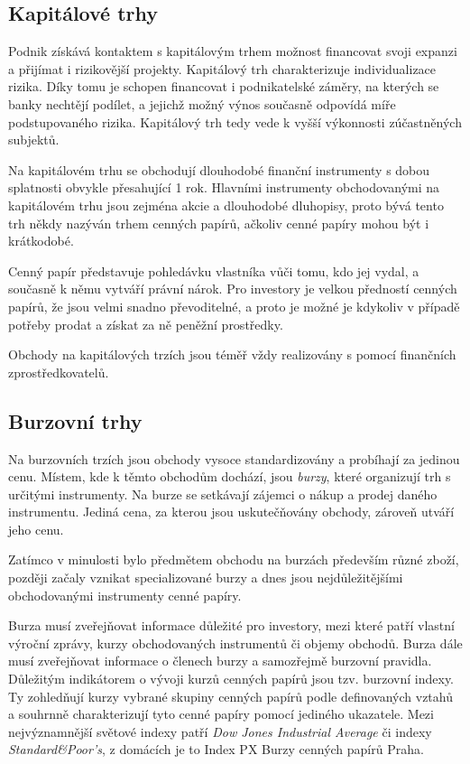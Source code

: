 \documentclass[thesis=M,czech]{FITthesis}[2012/06/26]
\begin{document}
\subsection{Kapitálové trhy}

Podnik získává kontaktem s kapitálovým trhem možnost financovat svoji expanzi a přijímat i rizikovější projekty. Kapitálový 
trh charakterizuje individualizace rizika. Díky tomu je schopen financovat i podnikatelské záměry, na kterých se banky 
nechtějí podílet, a jejichž možný výnos současně odpovídá míře podstupovaného rizika. Kapitálový trh tedy vede k vyšší 
výkonnosti zúčastněných subjektů. %

Na kapitálovém trhu se obchodují dlouhodobé finanční instrumenty s dobou splatnosti obvykle přesahující 1 rok. Hlavními 
instrumenty obchodovanými na kapitálovém trhu jsou zejména akcie a dlouhodobé dluhopisy, proto bývá tento trh někdy 
nazýván trhem cenných papírů, ačkoliv cenné papíry mohou být i krátkodobé. %

Cenný papír představuje pohledávku vlastníka 
vůči tomu, kdo jej vydal, a současně k němu vytváří právní nárok. Pro investory je velkou předností cenných papírů, 
že jsou velmi snadno převoditelné, a proto je možné je kdykoliv v případě potřeby prodat a získat za ně peněžní prostředky. 

Obchody na kapitálových trzích jsou téměř vždy realizovány s pomocí finančních zprostředkovatelů. %


\subsection{Burzovní trhy}

Na burzovních trzích jsou obchody vysoce standardizovány a probíhají za jedinou cenu. Místem, kde k těmto obchodům 
dochází, jsou \textit{burzy}, které organizují trh s určitými instrumenty. Na burze se setkávají zájemci o nákup a prodej 
daného instrumentu. Jediná cena, za kterou jsou uskutečňovány obchody, zároveň utváří jeho cenu. %

Zatímco v minulosti bylo předmětem obchodu na burzách především různé zboží, později začaly vznikat specializované 
burzy a dnes jsou nejdůležitějšími obchodovanými instrumenty cenné papíry. \cite{hebu}

Burza musí zveřejňovat informace důležité pro investory, mezi které patří vlastní výroční zprávy, kurzy obchodovaných 
instrumentů či objemy obchodů. Burza dále musí zveřejňovat informace o členech burzy a samozřejmě burzovní pravidla. 
Důležitým indikátorem o vývoji kurzů cenných papírů jsou tzv. burzovní indexy. Ty zohledňují kurzy vybrané skupiny cenných 
papírů podle definovaných vztahů a souhrnně charakterizují tyto cenné papíry pomocí jediného ukazatele. Mezi 
nejvýznamnější světové indexy patří \textit{Dow Jones Industrial Average} či indexy \textit{Standard\&Poor's}, 
z domácích je to Index PX Burzy cenných papírů Praha. %
\end{document}
